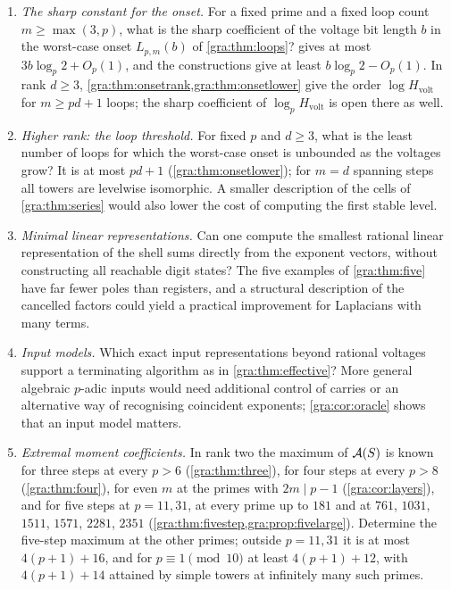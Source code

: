 \begin{enumerate}
\item \emph{The sharp constant for the onset.} For a fixed prime and a
fixed loop count $m\ge\max(3,p)$, what is the sharp coefficient of the
voltage bit length $b$ in the worst-case onset $L_{p,m}(b)$ of
\cref{gra:thm:loops}?  gives at most
$3b\log_p2+O_p(1)$, and the constructions give at least
$b\log_p2-O_p(1)$. In rank $d\ge3$, \cref{gra:thm:onsetrank,gra:thm:onsetlower}
give the order $\log H_{\mathrm{volt}}$ for $m\ge pd+1$ loops; the sharp
coefficient of $\log_pH_{\mathrm{volt}}$ is open there as well.
\item \emph{Higher rank: the loop threshold.} For fixed $p$ and $d\ge3$,
what is the least number of loops for which the worst-case onset is
unbounded as the voltages grow? It is at most $pd+1$
(\cref{gra:thm:onsetlower}); for $m=d$ spanning steps all towers are
levelwise isomorphic. A smaller description of the cells of
\cref{gra:thm:series} would also lower the cost of computing the first
stable level.
\item \emph{Minimal linear representations.} Can one compute the smallest
rational linear representation of the shell sums directly from the
exponent vectors, without constructing all reachable digit states? The
five examples of \cref{gra:thm:five} have far fewer poles than registers,
and a structural description of the cancelled factors could yield a
practical improvement for Laplacians with many terms.
\item \emph{Input models.} Which exact input representations beyond
rational voltages support a terminating algorithm as in
\cref{gra:thm:effective}? More general algebraic $p$-adic inputs would
need additional control of carries or an alternative way of recognising
coincident exponents; \cref{gra:cor:oracle} shows that an input model
matters.
\item \emph{Extremal moment coefficients.} In rank two the maximum of
$\mathcal{A}(S)$ is known for three steps at every $p>6$ (\cref{gra:thm:three}),
for four steps at every $p>8$ (\cref{gra:thm:four}), for even $m$ at the
primes with $2m\mid p-1$ (\cref{gra:cor:layers}), and for five steps at
$p=11,31$, at every prime up to $181$ and at $761$, $1031$, $1511$,
$1571$, $2281$, $2351$ (\cref{gra:thm:fivestep,gra:prop:fivelarge}).
Determine the five-step maximum at the other primes; outside $p=11,31$ it
is at most $4(p+1)+16$, and for $p\equiv1\pmod{10}$ at least $4(p+1)+12$,
with $4(p+1)+14$ attained by simple towers at infinitely many such primes.

\end{enumerate}
